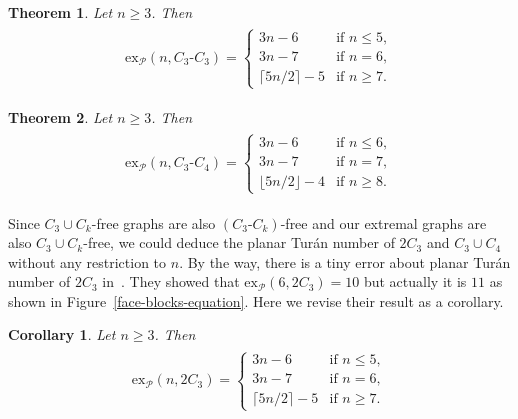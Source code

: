 \documentclass[12pt]{article}
\newtheorem{thm}{Theorem}[section]
\newtheorem{cor}{Corollary}[section]
\newcommand{\ex}{\mathrm{ex}}
\begin{document}
\begin{thm}\label{thm1}
    Let $n\geq 3$. Then
    \begin{align*}
        \begin{split}
            \ex_{\mathcal{P}}(n,C_3\text{-}C_3) = \left\{
                \begin{array}{ll}
                3n-6 & \text{if } n\leq 5,\\
                3n-7 & \text{if } n=6,\\
                \lceil 5n/2 \rceil - 5 & \text{if } 
                n\geq 7.
                \end{array}
            \right.
        \end{split}
    \end{align*}
\end{thm}

\begin{thm}\label{thm2}
    Let $n\geq 3$. Then
    \begin{align*}
        \begin{split}
            \ex_{\mathcal{P}}(n,C_3\text{-}C_4) = \left\{
                \begin{array}{ll}
                3n-6 & \text{if } n\leq 6,\\
                3n-7 & \text{if } n=7,\\
                \lfloor 5n/2 \rfloor - 4 & \text{if } 
                n\geq 8.
                \end{array}
            \right.
        \end{split}
    \end{align*}
\end{thm}

Since $C_3 \cup C_k$-free graphs are also $(C_3\text{-}C_k)$-free and our extremal graphs are also $C_3 \cup C_k$-free, we could deduce the planar Tur\'an number of $2C_3$ and $C_3 \cup C_4$ without any restriction to $n$. By the way, there is a tiny error about planar Tur\'an number of $2C_3$ in~\cite{lan2024planar}. They showed that $\ex_{\mathcal{P}}(6,2C_3)=10$ but actually it is $11$ as shown in Figure~\ref{face-blocks-equation}. Here we revise their result as a corollary. 

\begin{cor}\cite{lan2024planar}
    Let $n\geq 3$. Then
    \begin{align*}
        \begin{split}
            \ex_{\mathcal{P}}(n,2C_3) = \left\{
                \begin{array}{ll}
                3n-6 & \text{if } n\leq 5,\\
                3n-7 & \text{if } n=6,\\
                \lceil 5n/2 \rceil - 5 & \text{if } 
                n\geq 7.
                \end{array}
            \right.
        \end{split}
    \end{align*}
\end{cor}
\end{document}
